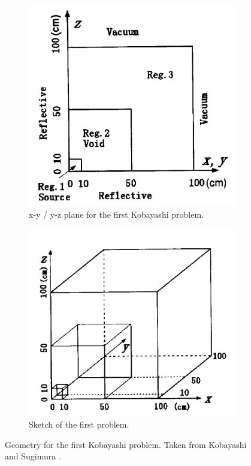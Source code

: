 \begin{figure}[H]
    \centering
    \begin{subfigure}[b]{0.45\textwidth}
        \centering
        \includegraphics[width=\textwidth]{images/verification/sn_kobayashi/geometry/1_geo_1.png}
        \caption{x-y / y-z plane for the first Kobayashi problem.}
        \label{fig:verification:sn_kobayashi_1_geo:1}
    \end{subfigure}
    \hfill
    \begin{subfigure}[b]{0.45\textwidth}
        \centering
        \includegraphics[width=\textwidth]{images/verification/sn_kobayashi/geometry/1_geo_2.png}
        \caption{Sketch of the first problem.}
        \label{fig:verification:sn_kobayashi_1_geo:2}
    \end{subfigure}
    \caption[Geometry for the first Kobayashi problem.]{Geometry for the first Kobayashi problem. Taken from Kobayashi and Sugimura \cite{kobayashi_benchmarks}.}
    \label{fig:verification:sn_kobayashi_1_geo}
\end{figure}
